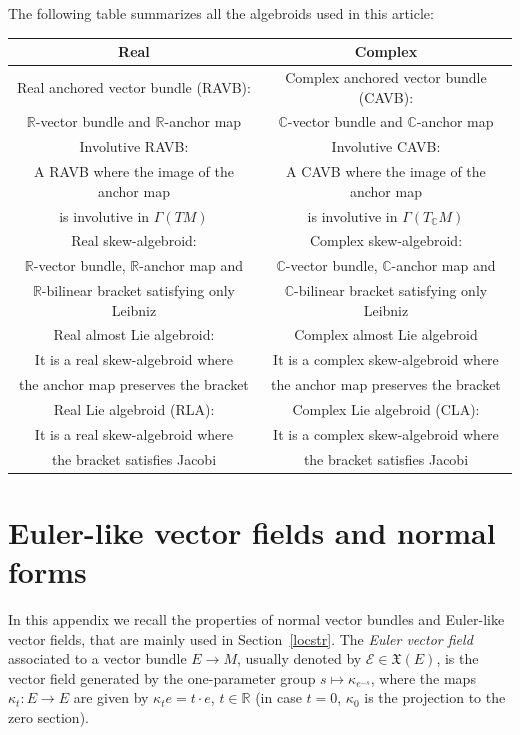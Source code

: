 \documentclass[pdftex]{sigma}
\numberwithin{equation}{section}
\newcommand{\R}{{\mathbb{R}}}
\newcommand{\C}{{\mathbb{C}}}
\begin{document}
The following table summarizes all the algebroids used in this article:
\begin{center}
    \begin{tabular}{@{}c|c@{}}
      Real & Complex\\
      \hline
Real anchored vector bundle (RAVB): & Complex anchored vector bundle (CAVB):\\
$\R$-vector bundle and $\R$-anchor map & $\C$-vector bundle and $\C$-anchor map\\
\hline
Involutive RAVB: & Involutive CAVB:\\
A RAVB where the image of the anchor map & A CAVB where the image of the anchor map\\
 is involutive in $\Gamma(TM)$ & is involutive in $\Gamma(T_{\C}M)$ \\
\hline
 Real skew-algebroid: & Complex skew-algebroid: \\
$\R$-vector bundle, $\R$-anchor map and &
$\C$-vector bundle, $\C$-anchor map and\\
$\R$-bilinear bracket satisfying only Leibniz & $\C$-bilinear bracket satisfying only Leibniz \\
\hline
Real almost Lie algebroid: & Complex almost Lie algebroid \\
It is a real skew-algebroid where &
It is a complex skew-algebroid where\\
 the anchor map preserves the bracket & the anchor map preserves the bracket \\
\hline
Real Lie algebroid (RLA): & Complex Lie algebroid (CLA):\\
It is a real skew-algebroid where &
It is a complex skew-algebroid where\\
 the bracket satisfies Jacobi & the bracket satisfies Jacobi \\
\hline
    \end{tabular}
    \end{center}

\section{Euler-like vector fields and normal forms}\label{preliminarieslocstr}
 In this appendix we recall the properties of normal vector bundles and Euler-like vector fields, that are mainly used in Section~\ref{locstr}.
The {\em Euler vector field} associated to a vector bundle $E\to M$, usually denoted by $\mathcal{E}\in \mathfrak{X}(E)$, is the vector field generated by the one-parameter group $s\mapsto \kappa_{e^{-s}}$, where the maps $\kappa_{t}\colon E\to E$ are given by $\kappa_{t}e=t\cdot e$, $t\in \R$ (in case $t=0$, $\kappa_0$ is the projection to the zero section).
\end{document}
